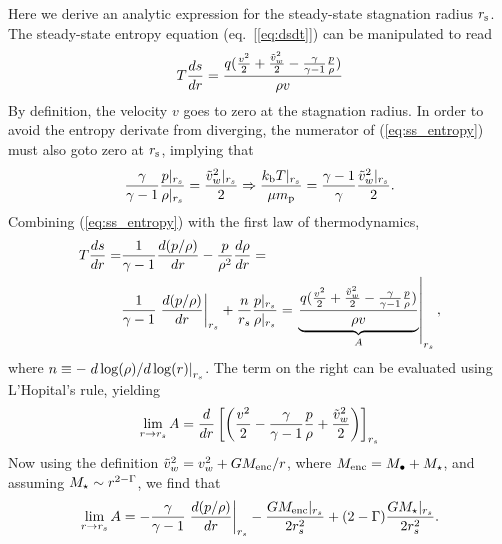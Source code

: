 
Here we derive an analytic expression for the steady-state stagnation radius $r_{\rm s}$.  The steady-state entropy equation (eq.~[\ref{eq:dsdt}]) can be manipulated to read
\begin{align}
T\frac{d s}{d r}=\frac{q (\frac{v^2}{2}+\frac{\tilde{v}_{w}^2}{2}-\frac{\gamma}{\gamma-1} \frac{p}{\rho})}{\rho v} \label{eq:ss_entropy}
\end{align}
By definition, the velocity $v$ goes to zero at the stagnation radius.  In order to avoid the entropy derivate from diverging, the numerator of (\ref{eq:ss_entropy}) must also goto zero at $r_{\rm s}$, implying that
\begin{align}
 \frac{\gamma}{\gamma-1} \frac{p|_{r_s}}{\rho|_{r_s}}=\frac{\tilde{v}_{w}^{2}|_{r_s}}{2} \Rightarrow \frac{k_{\rm b} T|_{r_s}}{\mu m_{\rm p}}=\frac{\gamma-1}{\gamma} \frac{\tilde{v}_{w}^{2}|_{r_s}}{2} .
\label{eq:appTanalytic}
\end{align}
Combining (\ref{eq:ss_entropy}) with the first law of thermodynamics,
\begin{align}
T\frac{d s}{d r} =& \frac{1}{\gamma-1}\frac{d (p/\rho)}{d r}-\frac{p}{\rho^2}\frac{d \rho}{d r} = \\
& 
\frac{1}{\gamma-1}\left.\frac{d (p/\rho)}{d r}\right|_{r_s}+\frac{n}{r_s}  \frac{p|_{r_s}}{\rho|_{r_s}}=\left.\underbrace{\frac{q (\frac{v^2}{2}+\frac{\tilde{v}_{w}^2}{2}-\frac{\gamma}{\gamma-1} \frac{p}{\rho})}{\rho  v}}_{A}\right|_{r_s}, 
 \label{eq:first_law}
\end{align}
where $n\equiv -\left.d\log(\rho)/d\log(r)\right|_{r_s}$.  The term on the right can be evaluated using L'Hopital's rule, yielding
\begin{align}
  \lim_{r \rightarrow r_s} A = \frac{d}{dr} \left[\left(\frac{v^2}{2} -\frac{\gamma}{\gamma-1} \frac{p}{\rho}+\frac{\tilde{v}_{w}^2}{2}\right)\right]_{r_s}
\end{align}
Now using the definition $\tilde{v}_{w}^2=v_{w}^2+ G M_{\rm enc}/r$, where
$M_{\rm enc}=M_{\bullet}+M_{\star}$, and assuming $M_{\star} \sim r^{2-\Gamma}$, we find that
\begin{align}
\lim_{r \rightarrow r_s} A=-\frac{\gamma}{\gamma-1}
\left.\frac{d (p/\rho)}{d r}\right|_{r_s}-\frac{G M_{\rm enc}|_{r_s}}{2 r_s^2}+(2-\Gamma) \frac{G
  M_{\star}|_{r_s}}{2 r_s^2}.
\end{align}
